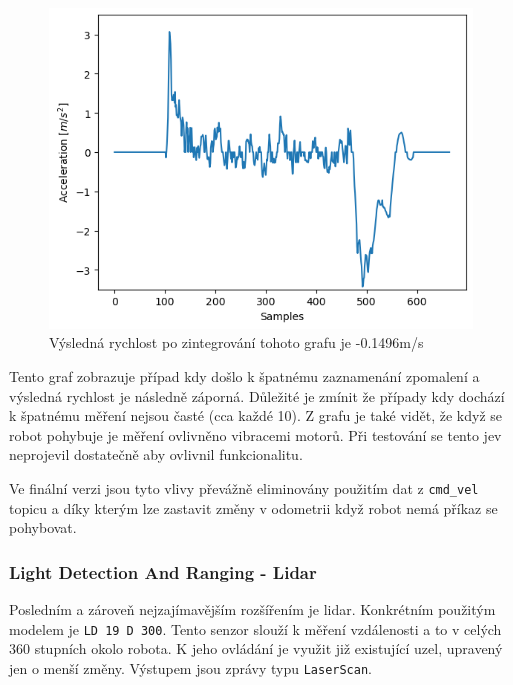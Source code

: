 \begin{figure}[h!]
	\centering
	\includegraphics[scale=0.75]{obrazky-figures/accelerometer_graph.png}
	\caption{Výsledná rychlost po zintegrování tohoto grafu je -0.1496m/s}
	\label{}
\end{figure}
Tento graf zobrazuje případ kdy došlo k špatnému zaznamenání zpomalení a výsledná rychlost je následně záporná. Důležité je zmínit že případy kdy dochází k špatnému měření nejsou časté (cca každé 10). Z grafu je také vidět, že když se robot pohybuje je měření ovlivněno vibracemi motorů. Při testování se tento jev neprojevil dostatečně aby ovlivnil funkcionalitu.

Ve finální verzi jsou tyto vlivy převážně eliminovány použitím dat z \verb|cmd_vel| topicu a díky kterým lze zastavit změny v odometrii když robot nemá příkaz se pohybovat.

\subsubsection*{Light Detection And Ranging - Lidar}
Posledním a zároveň nejzajímavějším rozšířením je lidar. Konkrétním použitým modelem je \verb|LD 19 D 300|. Tento senzor slouží k měření vzdálenosti a to v celých 360 stupních okolo robota. K jeho ovládání je využit již existující uzel, upravený jen o menší změny. Výstupem jsou zprávy typu \verb|LaserScan|.

